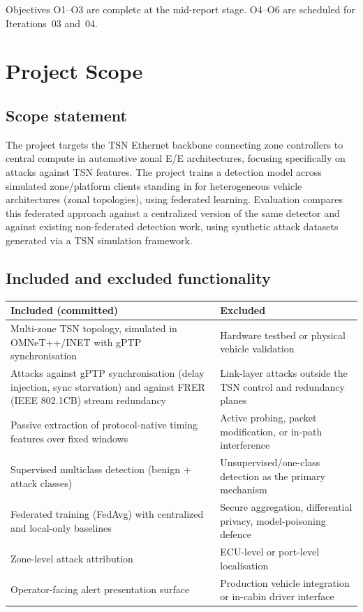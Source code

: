 Objectives O1--O3 are complete at the mid-report stage. O4--O6 are scheduled for
Iterations~03 and~04.

\section{Project Scope}
\label{sec:scope}

\subsection*{Scope statement}
The project targets the TSN Ethernet backbone connecting zone controllers to central
compute in automotive zonal E/E architectures, focusing specifically on attacks
against TSN features. The project trains a detection model across simulated
zone/platform clients standing in for heterogeneous vehicle architectures (zonal
topologies), using federated learning. Evaluation compares this federated approach
against a centralized version of the same detector and against existing
non-federated detection work, using synthetic attack datasets generated via a TSN
simulation framework.

\subsection*{Included and excluded functionality}

\begin{longtable}{p{} p{}}
\toprule
\textbf{Included (committed)} & \textbf{Excluded} \\
\midrule
\endhead
Multi-zone TSN topology, simulated in OMNeT++/INET with gPTP synchronisation &
Hardware testbed or physical vehicle validation \\
\addlinespace
Attacks against gPTP synchronisation (delay injection, sync starvation) and against
FRER (IEEE 802.1CB) stream redundancy &
Link-layer attacks outside the TSN control and redundancy planes \\
\addlinespace
Passive extraction of protocol-native timing features over fixed windows &
Active probing, packet modification, or in-path interference \\
\addlinespace
Supervised multiclass detection (benign $+$ attack classes) &
Unsupervised/one-class detection as the primary mechanism \\
\addlinespace
Federated training (FedAvg) with centralized and local-only baselines &
Secure aggregation, differential privacy, model-poisoning defence \\
\addlinespace
Zone-level attack attribution &
ECU-level or port-level localisation \\
\addlinespace
Operator-facing alert presentation surface &
Production vehicle integration or in-cabin driver interface \\
\bottomrule
\end{longtable}

